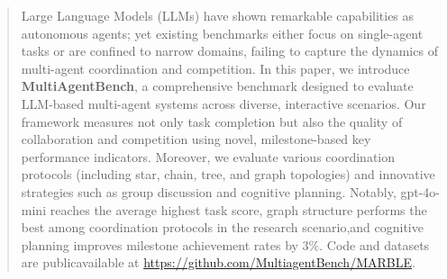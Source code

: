 \documentclass[11pt]{article}
\begin{document}
\begin{abstract}
Large Language Models (LLMs) have shown remarkable capabilities as autonomous agents; yet existing benchmarks either focus on single-agent tasks or are confined to narrow domains, failing to capture the dynamics of multi-agent coordination and competition. In this paper, we introduce \textbf{MultiAgentBench}, a comprehensive benchmark designed to evaluate LLM-based multi-agent systems across diverse, interactive scenarios. Our framework measures not only task completion but also the quality of collaboration and competition using novel, milestone-based key performance indicators. Moreover, we evaluate various coordination protocols (including star, chain, tree, and graph topologies) and innovative strategies such as group discussion and cognitive planning. Notably, gpt-4o-mini reaches the average highest task score, graph structure performs the best among coordination protocols in the research scenario,and cognitive planning improves milestone achievement rates by 3\%. Code and datasets are publicavailable at \url{https://github.com/MultiagentBench/MARBLE}.

\end{abstract}









\clearpage

\end{document}

